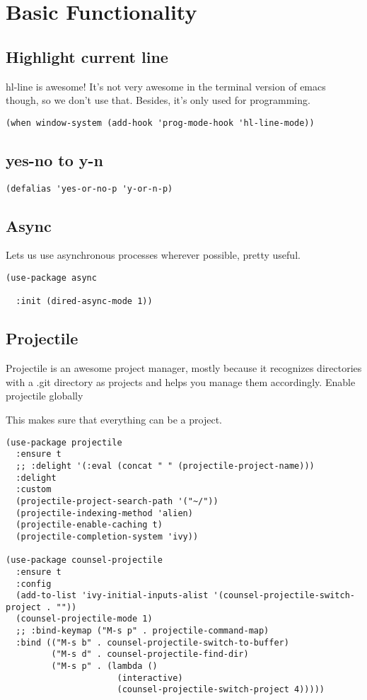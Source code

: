 \documentclass[12pt]{article}
\begin{document}
\section{Basic Functionality}
\label{sec:org829c4cf}
\subsection{Highlight current line}
\label{sec:orgaba1b97}

hl-line is awesome! It’s not very awesome in the terminal version of emacs though, so we don’t use that. Besides, it’s only used for programming.
\begin{verbatim}
(when window-system (add-hook 'prog-mode-hook 'hl-line-mode))
\end{verbatim}

\subsection{yes-no to y-n}
\label{sec:org6c0caaa}
\begin{verbatim}
(defalias 'yes-or-no-p 'y-or-n-p)
\end{verbatim}

\subsection{Async}
\label{sec:org951275d}

Lets us use asynchronous processes wherever possible, pretty useful.
\begin{verbatim}
(use-package async

  :init (dired-async-mode 1))
\end{verbatim}

\subsection{Projectile}
\label{sec:org6fa0146}
Projectile is an awesome project manager, mostly because it recognizes directories with a .git directory as projects and helps you manage them accordingly.
Enable projectile globally

This makes sure that everything can be a project.
\begin{verbatim}
(use-package projectile
  :ensure t
  ;; :delight '(:eval (concat " " (projectile-project-name)))
  :delight
  :custom
  (projectile-project-search-path '("~/"))
  (projectile-indexing-method 'alien)
  (projectile-enable-caching t)
  (projectile-completion-system 'ivy))

(use-package counsel-projectile
  :ensure t
  :config
  (add-to-list 'ivy-initial-inputs-alist '(counsel-projectile-switch-project . ""))
  (counsel-projectile-mode 1)
  ;; :bind-keymap ("M-s p" . projectile-command-map)
  :bind (("M-s b" . counsel-projectile-switch-to-buffer)
         ("M-s d" . counsel-projectile-find-dir)
         ("M-s p" . (lambda ()
                      (interactive)
                      (counsel-projectile-switch-project 4)))))
\end{verbatim}
\end{document}
